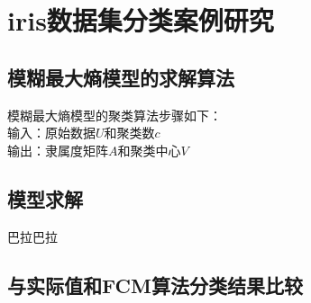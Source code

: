 \chapter{iris数据集分类案例研究}
\section{模糊最大熵模型的求解算法}
模糊最大熵模型的聚类算法步骤如下：\\
输入：原始数据$U$和聚类数$c$\\
输出：隶属度矩阵$A$和聚类中心$V$\\
\section{模型求解}
巴拉巴拉
\section{与实际值和FCM算法分类结果比较}